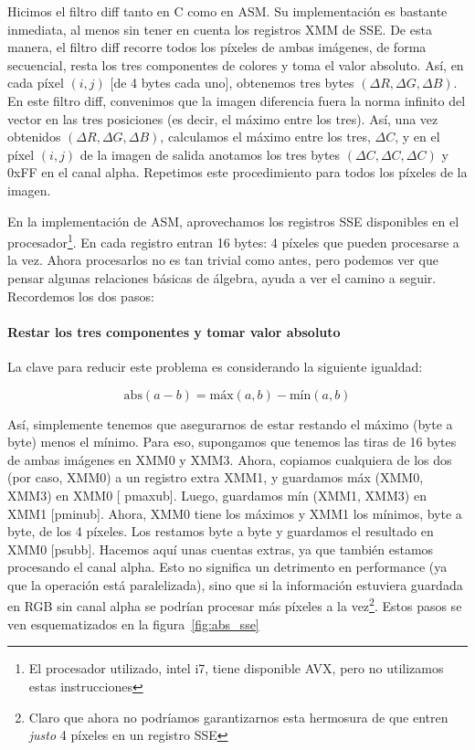 Hicimos el filtro {\ttfamily diff} tanto en C como en ASM. Su
implementación es bastante inmediata, al menos sin tener en cuenta los
registros {\ttfamily XMM} de {\ttfamily SSE}. De esta manera, el
filtro {\ttfamily diff} recorre todos los píxeles de ambas imágenes,
de forma secuencial, resta los tres componentes de colores y toma el
valor absoluto. Así, en cada píxel $(i, j)$ [de 4 bytes cada uno],
obtenemos tres bytes $(\Delta R, \Delta G, \Delta B)$. En este filtro
{\ttfamily diff}, convenimos que la imagen diferencia fuera la norma
infinito del vector en las tres posiciones (es decir, el máximo entre
los tres). Así, una vez obtenidos $(\Delta R, \Delta G, \Delta B)$,
calculamos el máximo entre los tres, $\Delta C$, y en el píxel
$(i, j)$ de la imagen de salida anotamos los tres bytes
$(\Delta C, \Delta C, \Delta C)$ y 0xFF en el canal
alpha. Repetimos este procedimiento para todos los píxeles de la
imagen.

En la implementación de ASM, aprovechamos los registros {\ttfamily
  SSE} disponibles en el procesador\footnote{El procesador utilizado,
  intel i7, tiene disponible {\ttfamily AVX}, pero no utilizamos estas
  instrucciones}. En cada registro entran 16 bytes: 4 píxeles que
pueden procesarse a la vez. Ahora procesarlos no es tan trivial como
antes, pero podemos ver que pensar algunas relaciones básicas de
álgebra, ayuda a ver el camino a seguir. Recordemos los dos pasos:

\paragraph{Restar los tres componentes y tomar valor absoluto} La clave
para reducir este problema es considerando la siguiente igualdad:

\begin{equation}
  \text{abs}(a - b) = \text{máx}(a, b) - \text{mín}(a, b)
\end{equation}

Así, simplemente tenemos que asegurarnos de estar restando el máximo
(byte a byte) menos el mínimo. Para eso, supongamos que tenemos las
tiras de 16 bytes de ambas imágenes en {\ttfamily XMM0} y {\ttfamily
  XMM3}. Ahora, copiamos cualquiera de los dos (por caso, {\ttfamily
  XMM0}) a un registro extra {\ttfamily XMM1}, y guardamos
{\ttfamily máx (XMM0, XMM3)} en {\ttfamily XMM0} [{\ttfamily
  pmaxub}]. Luego, guardamos {\ttfamily mín (XMM1, XMM3)} en
{\ttfamily XMM1} [{\ttfamily pminub}]. Ahora, {\ttfamily XMM0} tiene
los máximos y {\ttfamily XMM1} los mínimos, byte a byte, de los 4
píxeles. Los restamos byte a byte y guardamos el resultado en
{\ttfamily XMM0} [{\ttfamily psubb}]. Hacemos aquí unas cuentas
extras, ya que también estamos procesando el canal alpha. Esto no
significa un detrimento en performance (ya que la operación está
paralelizada), sino que si la información estuviera guardada en RGB
sin canal alpha se podrían procesar más píxeles a la
vez\footnote{Claro que ahora no podríamos garantizarnos esta
  hermosura de que entren \emph{justo} 4 píxeles en un registro
  {\ttfamily SSE}}. Estos pasos se ven esquematizados en la
figura~\ref{fig:abs_sse}

